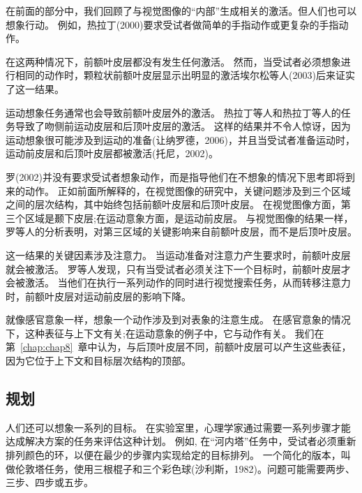 在前面的部分中，我们回顾了与视觉图像的“内部”生成相关的激活。但人们也可以想象行动。
例如，热拉丁(2000)要求受试者做简单的手指动作或更复杂的手指动作。
\par


在这两种情况下，前额叶皮层都没有发生任何激活。
然而，当受试者必须想象进行相同的动作时，颗粒状前额叶皮层显示出明显的激活埃尔松等人(2003)后来证实了这一结果。
\par


运动想象任务通常也会导致前额叶皮层外的激活。
热拉丁等人和热拉丁等人的任务导致了吻侧前运动皮层和后顶叶皮层的激活。
这样的结果并不令人惊讶，因为运动想象很可能涉及到运动的准备(让纳罗德，2006)，并且当受试者准备运动时，运动前皮层和后顶叶皮层都被激活(托尼，2002)。
\par


罗(2002)并没有要求受试者想象动作，而是指导他们在不想象的情况下思考即将到来的动作。
正如前面所解释的，在视觉图像的研究中，关键问题涉及到三个区域之间的层次结构，其中始终包括前额叶皮层和后顶叶皮层。
在视觉图像方面，第三个区域是颞下皮层;在运动意象方面，是运动前皮层。
与视觉图像的结果一样，罗等人的分析表明，对第三区域的关键影响来自前额叶皮层，而不是后顶叶皮层。
\par


这一结果的关键因素涉及注意力。
当运动准备对注意力产生要求时，前额叶皮层就会被激活。
罗等人发现，只有当受试者必须关注下一个目标时，前额叶皮层才会被激活。
当他们在执行一系列动作的同时进行视觉搜索任务，从而转移注意力时，前额叶皮层对运动前皮层的影响下降。
\par


就像感官意象一样，想象一个动作涉及到对表象的注意生成。
在感官意象的情况下，这种表征与上下文有关;在运动意象的例子中，它与动作有关。
我们在第~\ref{chap:chap8}~章中认为，与后顶叶皮层不同，前额叶皮层可以产生这些表征，因为它位于上下文和目标层次结构的顶部。
\par



\subsection{规划}

人们还可以想象一系列的目标。
在实验室里，心理学家通过需要一系列步骤才能达成解决方案的任务来评估这种计划。
例如, 在“河内塔”任务中，受试者必须重新排列颜色的环，以便在最少的步骤内实现给定的目标排列。
一个简化的版本，叫做伦敦塔任务，使用三根棍子和三个彩色球(沙利斯，1982)。问题可能需要两步、三步、四步或五步。
\par


